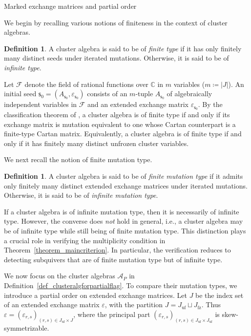 \documentclass[11pt]{amsart}
\makeatletter
\def\subsection{\@startsection{subsection}{2}%
  \z@{-.8\linespacing\@plus-.3\linespacing}{.3\linespacing\@plus.2\linespacing}%
  {\normalfont\bfseries}}
\newcommand{\C}{\mathbb{C}}
\def\mcal{\mathcal}
\numberwithin{equation}{section}
\theoremstyle{plain}
\theoremstyle{definition}
\newtheorem{definition}[theorem]{Definition}
\numberwithin{equation}{section}
\newcommand{\seed}{\mathsf{s}}
\makeatother
\begin{document}
\subsection{Marked exchange matrices and partial order}

We begin by recalling various notions of finiteness in the context of cluster algebras.

\begin{definition}\label{def_clufininfin}
A cluster algebra is said to be of \emph{finite type} if it has only finitely many distinct seeds under iterated mutations. Otherwise, it is said to be of \emph{infinite type}. 
\end{definition}

Let $\mcal{F}$ denote the field of rational functions over $\C$ in $m$ variables ($m \coloneqq |J|$). An initial seed $\seed_0 = (A_{\seed_0}, \varepsilon_{\seed_0})$ consists of an $m$-tuple $A_{\seed_0}$ of algebraically independent variables in $\mcal{F}$ and an extended exchange matrix $\varepsilon_{\seed_0}$. By the classification theorem of \cite{FZ03}, a cluster algebra is of finite type if and only if its exchange matrix is mutation equivalent to one whose Cartan counterpart is a finite-type Cartan matrix. Equivalently, a cluster algebra is of finite type if and only if it has finitely many distinct unfrozen cluster variables.

We next recall the notion of finite mutation type.

\begin{definition} 
A cluster algebra is said to be of \emph{finite mutation type} if it admits only finitely many distinct extended exchange matrices under iterated mutations. Otherwise, it is said to be of \emph{infinite mutation type}. 
\end{definition}

If a cluster algebra is of infinite mutation type, then it is necessarily of infinite type. However, the converse does \emph{not} hold in general, i.e., a cluster algebra may be of infinite type while still being of finite mutation type. This distinction plays a crucial role in verifying the multiplicity condition in Theorem~\ref{theorem_maincriterion}. In particular, the verification reduces to detecting subquivers that are of finite mutation type but of infinite type.

We now focus on the cluster algebras $\mcal{A}_P$ in Definition~\ref{def_clusteralgforpartialflag}. To compare their mutation types, we introduce a partial order on extended exchange matrices. Let $J$ be the index set of an extended exchange matrix $\varepsilon$, with the partition $J = J_\mathrm{uf} \sqcup J_\mathrm{fz}$. Thus $\varepsilon = (\varepsilon_{r,s})_{(r,s) \in J_\mathrm{uf} \times J}$, where the principal part $(\varepsilon_{r,s})_{(r,s) \in J_\mathrm{uf} \times J_\mathrm{uf}}$ is skew-symmetrizable. 
\end{document}
